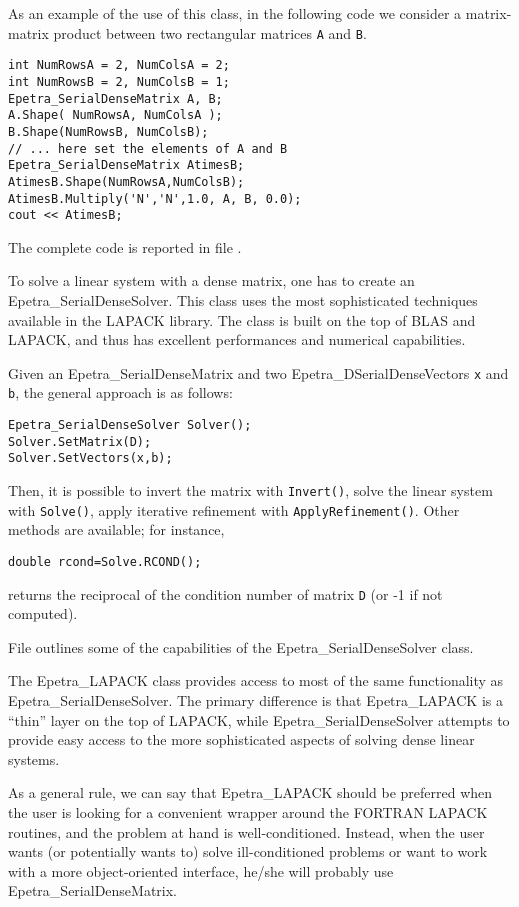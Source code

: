 As an example of the use of this class, in the following code we
consider a matrix-matrix product between two rectangular matrices
\verb!A! and \verb!B!. 
\begin{verbatim}
int NumRowsA = 2, NumColsA = 2;
int NumRowsB = 2, NumColsB = 1;
Epetra_SerialDenseMatrix A, B;
A.Shape( NumRowsA, NumColsA );
B.Shape(NumRowsB, NumColsB);
// ... here set the elements of A and B
Epetra_SerialDenseMatrix AtimesB;
AtimesB.Shape(NumRowsA,NumColsB);  
AtimesB.Multiply('N','N',1.0, A, B, 0.0);
cout << AtimesB;
\end{verbatim}
The complete code is reported in file
.

\smallskip

To solve a linear system with a dense matrix, one has to create an
Epetra\_SerialDenseSolver. This class uses the most sophisticated
techniques available in the LAPACK library. The class is
built on the top of BLAS and LAPACK, and thus has excellent performances
and numerical capabilities.

Given an Epetra\_SerialDenseMatrix and two Epetra\_DSerialDenseVectors
{\tt x} and {\tt b}, the general approach is as follows:
\begin{verbatim}
Epetra_SerialDenseSolver Solver();
Solver.SetMatrix(D);
Solver.SetVectors(x,b);
\end{verbatim}
Then, it is possible to invert the matrix with \verb!Invert()!, solve
the linear system with \verb!Solve()!, apply iterative refinement with
\verb!ApplyRefinement()!. Other methods are available; for instance,
\begin{verbatim}
double rcond=Solve.RCOND();
\end{verbatim}
returns the reciprocal of the condition number of matrix {\tt D} (or -1
if not computed).

File  outlines some of the capabilities of the
Epetra\_SerialDenseSolver class.

\smallskip

The Epetra\_LAPACK class provides access to most of the same
functionality as Epetra\_SerialDenseSolver. The primary difference is
that Epetra\_LAPACK is a ``thin'' layer on the top of LAPACK, while
Epetra\_SerialDenseSolver attempts to provide easy access to the more
sophisticated aspects of solving dense linear systems.

As a general rule, we can say that Epetra\_LAPACK should be preferred
when the user is looking for a convenient wrapper around the FORTRAN
LAPACK routines, and the problem at hand is well-conditioned. Instead,
when the user wants (or potentially wants to) solve ill-conditioned
problems or want to work with a more object-oriented interface, he/she
will probably use Epetra\_SerialDenseMatrix.


